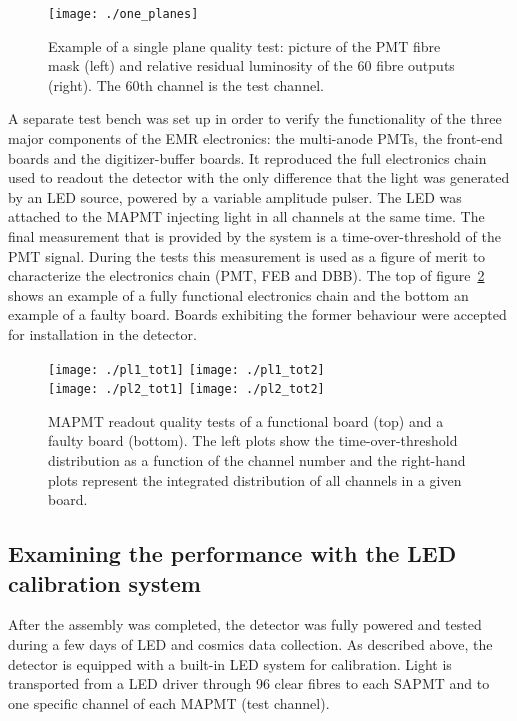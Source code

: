 \documentclass[a4paper,11pt]{article}
\begin{document}
\begin{figure}[htb]
 \centering
 \texttt{[image: ./one\_planes]}
 \caption[Example of plane quality tests]{Example of a single plane quality test: picture of the PMT fibre mask (left) and relative residual luminosity of the 60 fibre outputs (right). The 60th channel is the test channel.}
 \label{fig:plane_tests_one_planes}
\end{figure}

A separate test bench was set up in order to verify the functionality of the three major components of the EMR electronics: the multi-anode PMTs, the 
front-end boards and the digitizer-buffer boards. It reproduced the full electronics chain used to readout the detector with the only difference that the
light was generated by an LED source, powered by a variable amplitude pulser. The LED was attached to the MAPMT injecting light in all channels at the same time. The
final measurement that is provided by the system is a time-over-threshold of the PMT signal. During the tests this measurement is used as a figure of merit
to characterize the electronics chain (PMT, FEB and DBB). The top of figure~\ref{fig:tot_feb_dbb_test} shows an example of a fully functional electronics chain
and the bottom an example of a faulty board. Boards exhibiting the former behaviour were accepted for
installation in the detector.

\begin{figure}[htb]
 \centering
 \texttt{[image: ./pl1\_tot1]}
 \texttt{[image: ./pl1\_tot2]}\\
 \texttt{[image: ./pl2\_tot1]}
 \texttt{[image: ./pl2\_tot2]}
 \caption[Electronics quality tests]{MAPMT readout quality tests of a functional board (top) and a faulty board (bottom). The left plots show the time-over-threshold
 distribution as a function of the channel number and the right-hand plots represent the integrated distribution of all channels in a given board.}
 \label{fig:tot_feb_dbb_test}
\end{figure}

\subsection{Examining the performance with the LED calibration system}\label{sec:led_perf}
After the assembly was completed, the detector was fully powered and tested during a few days of LED and cosmics data collection. As described above,
the detector is equipped with a built-in LED system for calibration.  Light is transported from a LED driver through 96 clear fibres to each SAPMT and to
one specific channel of each MAPMT (test channel). 
\end{document}
